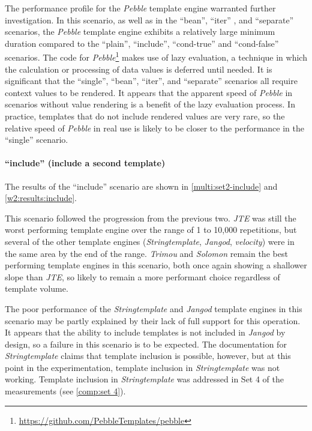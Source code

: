 \label{A153}
The performance profile for the \emph{Pebble} \gls{template engine} warranted further investigation. In this scenario, as well as in the \enquote{bean}, \enquote{iter} , and \enquote{separate} scenarios, the \emph{Pebble} \gls{template engine} exhibits a relatively large minimum duration compared to the \enquote{plain}, \enquote{include}, \enquote{cond-true} and \enquote{cond-false} scenarios. The code for \emph{Pebble}\footnote{\url{https://github.com/PebbleTemplates/pebble}} makes use of \gls{lazy evaluation}, a technique in which the calculation or processing of data values is deferred until needed. It is significant that the \enquote{single}, \enquote{bean}, \enquote{iter}, and \enquote{separate} scenarios all require context values to be rendered. It appears that the apparent speed of \emph{Pebble} in scenarios without value rendering is a benefit of the lazy evaluation process. In practice, templates that do not include rendered values are very rare, so the relative speed of \emph{Pebble} in real use is likely to be closer to the performance in the \enquote{single} scenario.

\paragraph{\enquote{include} (include a second template)}

The results of the \enquote{include} scenario are shown in \autoref{multi:set2-include} and \autoref{w2:results:include}.

This scenario followed the progression from the previous two. \emph{JTE} was still the worst performing \gls{template engine} over the range of 1 to 10,000 repetitions, but several of the other \gls{template engine}s (\emph{Stringtemplate}, \emph{Jangod}, \emph{velocity}) were in the same area by the end of the range. \emph{Trimou} and \emph{Solomon} remain the best performing \gls{template engine}s in this scenario, both once again showing a shallower slope than \emph{JTE}, so likely to remain a more performant choice regardless of template volume.

The poor performance of the \emph{Stringtemplate} and \emph{Jangod} \gls{template engine}s in this scenario may be partly explained by their lack of full support for this operation. It appears that the ability to include templates is not included in \emph{Jangod} by design, so a failure in this scenario is to be expected. The documentation for \emph{Stringtemplate} claims that template inclusion is possible, however, but at this point in the experimentation, template inclusion in \emph{Stringtemplate} was not working. Template inclusion in \emph{Stringtemplate} was addressed in Set 4 of the measurements (see \autoref{comp:set 4}).

